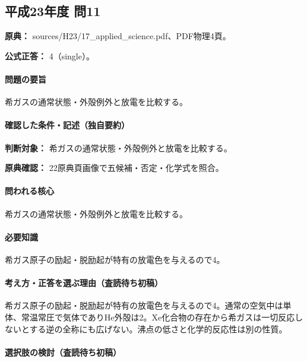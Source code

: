 \subsection{平成23年度 問11}
\label{q:h23-reg-applied-11}

\noindent\textbf{原典：} sources/H23/17\_applied\_science.pdf、PDF物理4頁。

\textbf{公式正答：} 4（single）。

\paragraph{問題の要旨} 希ガスの通常状態・外殻例外と放電を比較する。

\paragraph{確認した条件・記述（独自要約）}\mbox{}\par

\noindent\textbf{判断対象：} 希ガスの通常状態・外殻例外と放電を比較する。\par

\noindent\textbf{原典確認：} 22原典頁画像で五候補・否定・化学式を照合。\par

\paragraph{問われる核心} 希ガスの通常状態・外殻例外と放電を比較する。

\paragraph{必要知識} 希ガス原子の励起・脱励起が特有の放電色を与えるので4。

\paragraph{考え方・正答を選ぶ理由（査読待ち初稿）} 希ガス原子の励起・脱励起が特有の放電色を与えるので4。通常の空気中は単体、常温常圧で気体でありHe外殻は2。Xe化合物の存在から希ガスは一切反応しないとする逆の全称にも広げない。沸点の低さと化学的反応性は別の性質。

\paragraph{選択肢の検討（査読待ち初稿）}\mbox{}\par

